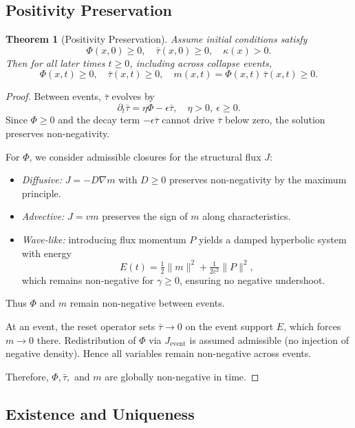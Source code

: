 \documentclass[11pt]{article}
\newtheorem{theorem}{Theorem}[section]
\begin{document}
\subsection{Positivity Preservation}

\begin{theorem}[Positivity Preservation]
Assume initial conditions satisfy
\[
\Phi(x,0) \geq 0, \quad \bar{\tau}(x,0) \geq 0, \quad \kappa(x) > 0.
\]
Then for all later times $t \geq 0$, including across collapse events,
\[
\Phi(x,t) \geq 0, \quad \bar{\tau}(x,t) \geq 0, \quad 
m(x,t) = \Phi(x,t)\,\bar{\tau}(x,t) \geq 0.
\]
\end{theorem}

\begin{proof}
Between events, $\bar{\tau}$ evolves by
\[
\partial_t \bar{\tau} = \eta \Phi - \epsilon \bar{\tau}, 
\quad \eta > 0, \ \epsilon \geq 0.
\]
Since $\Phi \geq 0$ and the decay term $-\epsilon \bar{\tau}$ cannot drive $\bar{\tau}$ below 
zero, the solution preserves non-negativity.

For $\Phi$, we consider admissible closures for the structural flux $J$:
\begin{itemize}[leftmargin=*]
    \item \emph{Diffusive:} $J = -D\nabla m$ with $D \geq 0$ preserves non-negativity 
    by the maximum principle.
    \item \emph{Advective:} $J = v m$ preserves the sign of $m$ along characteristics.
    \item \emph{Wave-like:} introducing flux momentum $P$ yields a damped 
    hyperbolic system with energy
    \[
    E(t) = \tfrac{1}{2}\|m\|^2 + \tfrac{1}{2c^2}\|P\|^2,
    \]
    which remains non-negative for $\gamma \geq 0$, ensuring no negative undershoot.
\end{itemize}
Thus $\Phi$ and $m$ remain non-negative between events.

At an event, the reset operator sets $\bar{\tau} \to 0$ on the event support $E$, 
which forces $m \to 0$ there. Redistribution of $\Phi$ via $J_{\text{event}}$ 
is assumed admissible (no injection of negative density). Hence all variables remain 
non-negative across events.

Therefore, $\Phi, \bar{\tau},$ and $m$ are globally non-negative in time.
\end{proof}


\subsection{Existence and Uniqueness}
\end{document}
